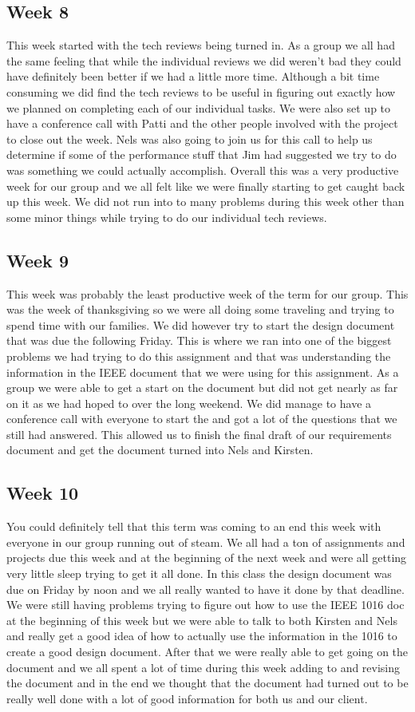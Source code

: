 \documentclass[10pt,draftclsnofoot,onecolumn]{IEEEtran}
\begin{document}
\subsection{Week 8}
This week started with the tech reviews being turned in. As a group we all had the same feeling that while the individual reviews we did weren't bad they could have definitely been better if we had a little more time. Although a bit time consuming we did find the tech reviews to be useful in figuring out exactly how we planned on completing each of our individual tasks. We were also set up to have a conference call with Patti and the other people involved with the project to close out the week. Nels was also going to join us for this call to help us determine if some of the performance stuff that Jim had suggested we try to do was something we could actually accomplish. Overall this was a very productive week for our group and we all felt like we were finally starting to get caught back up this week. We did not run into to many problems during this week other than some minor things while trying to do our individual tech reviews. 

\subsection{Week 9}
This week was probably the least productive week of the term for our group. This was the week of thanksgiving so we were all doing some traveling and trying to spend time with our families. We did however try to start the design document that was due the following Friday. This is where we ran into one of the biggest problems we had trying to do this assignment and that was understanding the information in the IEEE document that we were using for this assignment. As a group we were able to get a start on the document but did not get nearly as far on it as we had hoped to over the long weekend. We did manage to have a conference call with everyone to start the and got a lot of the questions that we still had answered. This allowed us to finish the final draft of our requirements document and get the document turned into Nels and Kirsten.  

\subsection{Week 10}
You could definitely tell that this term was coming to an end this week with everyone in our group running out of steam. We all had a ton of assignments and projects due this week and at the beginning of the next week and were all getting very little sleep trying to get it all done. In this class the design document was due on Friday by noon and we all really wanted to have it done by that deadline. We were still having problems trying to figure out how to use the IEEE 1016 doc at the beginning  of this week but we were able to talk to both Kirsten and Nels and really get a good idea of how to actually use the information in the 1016 to create a good design document. After that we were really able to get going on the document and we all spent a lot of time during this week adding to and revising the document and in the end we thought that the document had turned out to be really well done with a lot of good information for both us and our client. 
\end{document}
